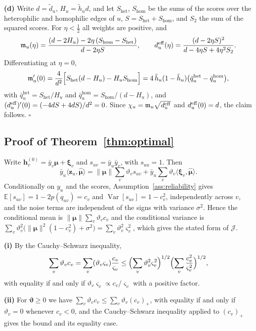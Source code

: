 \noindent\textbf{(d)} Write $d=\tilde d_u$, $H_u=\tilde h_ud$, and let $S_{\mathrm{het}}$, $S_{\mathrm{hom}}$ be the sums of the scores over the heterophilic and homophilic edges of $u$, $S=S_{\mathrm{het}}+S_{\mathrm{hom}}$, and $S_2$ the sum of the squared scores.
For $\eta<\tfrac12$ all weights are positive, and
\[
\mathfrak{m}_u(\eta)=\frac{(d-2H_u)-2\eta\,(S_{\mathrm{hom}}-S_{\mathrm{het}})}{d-2\eta S},\qquad
d^{\mathrm{eff}}_u(\eta)=\frac{(d-2\eta S)^2}{d-4\eta S+4\eta^2S_2}.
\]
Differentiating at $\eta=0$,
\[
\mathfrak{m}_u'(0)=\frac{4}{d^2}\Bigl[S_{\mathrm{het}}(d-H_u)-H_uS_{\mathrm{hom}}\Bigr]
=4\,\tilde h_u(1-\tilde h_u)\bigl(\bar q^{\mathrm{het}}_u-\bar q^{\mathrm{hom}}_u\bigr),
\]
with $\bar q^{\mathrm{het}}_u=S_{\mathrm{het}}/H_u$ and $\bar q^{\mathrm{hom}}_u=S_{\mathrm{hom}}/(d-H_u)$, and $(d^{\mathrm{eff}}_u)'(0)=(-4dS+4dS)/d^2=0$.
Since $\chi_u=\mathfrak{m}_u\sqrt{d^{\mathrm{eff}}_u}$ and $d^{\mathrm{eff}}_u(0)=d$, the claim follows.
\hfill$\square$

\subsection{Proof of Theorem~\ref{thm:optimal}}
Write $\bm h^{(0)}_v=\bar y_v\bm\mu+\bm\xi_v$ and $s_{uv}=\bar y_u\bar y_v$, with $s_{uu}=1$.
Then
\[
\bar y_u\langle\bm z_u,\hat{\bm\mu}\rangle=\|\bm\mu\|\sum_v\vartheta_vs_{uv}+\bar y_u\sum_v\vartheta_v\langle\bm\xi_v,\hat{\bm\mu}\rangle.
\]
Conditionally on $y_u$ and the scores, Assumption~\ref{ass:reliability} gives $\mathbb E[s_{uv}]=1-2p(q_{uv})=c_v$ and $\operatorname{Var}[s_{uv}]=1-c_v^2$, independently across $v$, and the noise terms are independent of the signs with variance $\sigma^2$.
Hence the conditional mean is $\|\bm\mu\|\sum_v\vartheta_vc_v$ and the conditional variance is $\sum_v\vartheta_v^2\bigl(\|\bm\mu\|^2(1-c_v^2)+\sigma^2\bigr)=\sum_v\vartheta_v^2\varsigma_v^2$, which gives the stated form of $\mathcal J$.

\noindent\textbf{(i)} By the Cauchy--Schwarz inequality,
\[
\sum_v\vartheta_vc_v=\sum_v(\vartheta_v\varsigma_v)\frac{c_v}{\varsigma_v}
\le\Bigl(\sum_v\vartheta_v^2\varsigma_v^2\Bigr)^{1/2}\Bigl(\sum_v\frac{c_v^2}{\varsigma_v^2}\Bigr)^{1/2},
\]
with equality if and only if $\vartheta_v\varsigma_v\propto c_v/\varsigma_v$ with a positive factor.

\noindent\textbf{(ii)} For $\bm\vartheta\ge0$ we have $\sum_v\vartheta_vc_v\le\sum_v\vartheta_v(c_v)_+$, with equality if and only if $\vartheta_v=0$ whenever $c_v<0$, and the Cauchy--Schwarz inequality applied to $(c_v)_+$ gives the bound and its equality case.

